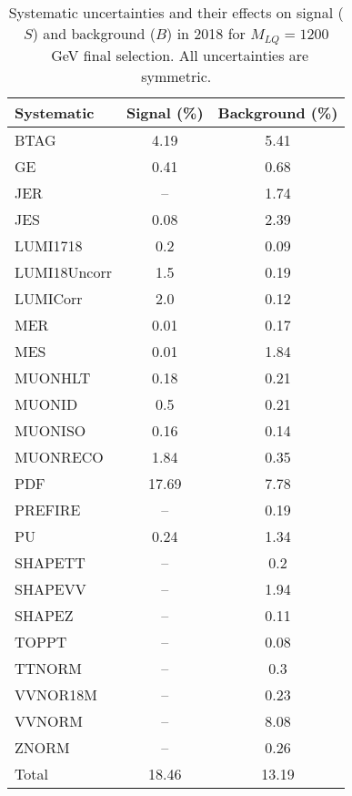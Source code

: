 \begin{table}[htbp]
\begin{center}
\caption{Systematic uncertainties and their effects on signal ($S$) and background ($B$) in 2018 for $M_{LQ}=1200$~GeV final selection. All uncertainties are symmetric.}
\begin{tabular}{lcc}
\hline\hline
Systematic & Signal (\%) & Background (\%) \\ \hline 
BTAG & 4.19 & 5.41\\ 
GE & 0.41 & 0.68\\ 
JER & -- & 1.74\\ 
JES & 0.08 & 2.39\\ 
LUMI1718 & 0.2 & 0.09\\ 
LUMI18Uncorr & 1.5 & 0.19\\ 
LUMICorr & 2.0 & 0.12\\ 
MER & 0.01 & 0.17\\ 
MES & 0.01 & 1.84\\ 
MUONHLT & 0.18 & 0.21\\ 
MUONID & 0.5 & 0.21\\ 
MUONISO & 0.16 & 0.14\\ 
MUONRECO & 1.84 & 0.35\\ 
PDF & 17.69 & 7.78\\ 
PREFIRE & -- & 0.19\\ 
PU & 0.24 & 1.34\\ 
SHAPETT & -- & 0.2\\ 
SHAPEVV & -- & 1.94\\ 
SHAPEZ & -- & 0.11\\ 
TOPPT & -- & 0.08\\ 
TTNORM & -- & 0.3\\ 
VVNOR18M & -- & 0.23\\ 
VVNORM & -- & 8.08\\ 
ZNORM & -- & 0.26\\ 
Total & 18.46 & 13.19\\ \hline \hline
\end{tabular}
\label{tab:SysUncertainties_uujj_1200}
\end{center}
\end{table}

